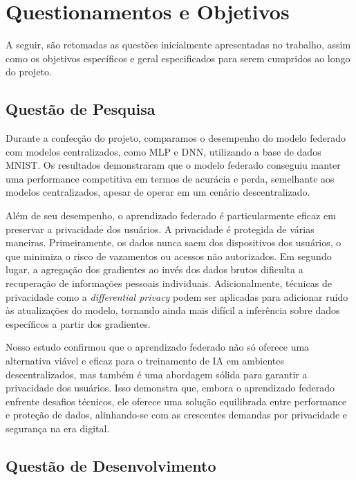 \section{Questionamentos e Objetivos}
\label{sec:questionamentos}

A seguir, são retomadas as questões inicialmente apresentadas no trabalho, assim como os objetivos específicos e geral especificados para serem cumpridos ao longo do projeto.

\subsection{Questão de Pesquisa}

Durante a confecção do projeto, comparamos o desempenho do modelo federado com modelos centralizados, como MLP e DNN, utilizando a base de dados MNIST. Os resultados demonstraram que o modelo federado conseguiu manter uma performance competitiva em termos de acurácia e perda, semelhante aos modelos centralizados, apesar de operar em um cenário descentralizado. 

Além de seu desempenho, o aprendizado federado é particularmente eficaz em preservar a privacidade dos usuários. A privacidade é protegida de várias maneiras. Primeiramente, os dados nunca saem dos dispositivos dos usuários, o que minimiza o risco de vazamentos ou acessos não autorizados. Em segundo lugar, a agregação dos gradientes ao invés dos dados brutos dificulta a recuperação de informações pessoais individuais. Adicionalmente, técnicas de privacidade como a \textit{differential privacy} podem ser aplicadas para adicionar ruído às atualizações do modelo, tornando ainda mais difícil a inferência sobre dados específicos a partir dos gradientes.

Nosso estudo confirmou que o aprendizado federado não só oferece uma alternativa viável e eficaz para o treinamento de IA em ambientes descentralizados, mas também é uma abordagem sólida para garantir a privacidade dos usuários. Isso demonstra que, embora o aprendizado federado enfrente desafios técnicos, ele oferece uma solução equilibrada entre performance e proteção de dados, alinhando-se com as crescentes demandas por privacidade e segurança na era digital.

\subsection{Questão de Desenvolvimento}

